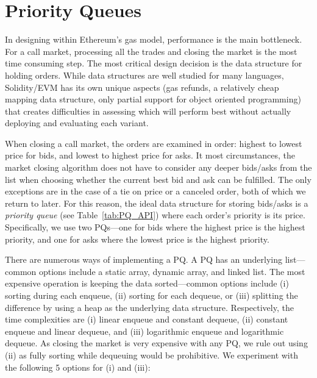 
\section{Priority Queues}\label{sec:pq}



In designing \cm within Ethereum's gas model, performance is the main bottleneck. For a call market, processing all the trades and closing the market is the most time consuming step. The most critical design decision is the data structure for holding orders. While data structures are well studied for many languages, Solidity/EVM has its own unique aspects (\eg gas refunds, a relatively cheap mapping data structure, only partial support for object oriented programming) that creates difficulties in assessing which will perform best without actually deploying and evaluating each variant. 

When closing a call market, the orders are examined in order: highest to lowest price for bids, and lowest to highest price for asks. It most circumstances, the market closing algorithm does not have to consider any deeper bids/asks from the list when choosing whether the current best bid and ask can be fulfilled. The only exceptions are in the case of a tie on price or a canceled order, both of which we return to later. For this reason, the ideal data structure for storing bids/asks is a \textit{priority queue} (see Table~\ref{tab:PQ_API}) where each order's priority is its price. Specifically, we use two PQs---one for bids where the highest price is the highest priority, and one for asks where the lowest price is the highest priority. 

There are numerous ways of implementing a PQ. A PQ has an underlying list---common options include a static array, dynamic array, and linked list. The most expensive operation is keeping the data sorted---common options include (i) sorting during each enqueue, (ii) sorting for each dequeue, or (iii) splitting the difference by using a heap as the underlying data structure. Respectively, the time complexities are (i) linear enqueue and constant dequeue, (ii) constant enqueue and linear dequeue, and (iii) logarithmic enqueue and logarithmic dequeue. As closing the market is very expensive with any PQ, we rule out using (ii) as fully sorting while dequeuing would be prohibitive. We experiment with the following 5 options for (i) and (iii):

